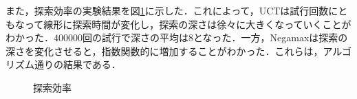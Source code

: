 \documentclass{jarticle}
\begin{document}
また，探索効率の実験結果を図\ref{fig:search}に示した．これによって，UCTは試行回数にともなって線形に探索時間が変化し，探索の深さは徐々に大きくなっていくことがわかった．$400000$回の試行で深さの平均は$8$となった．一方，Negamaxは探索の深さを変化させると，指数関数的に増加することがわかった．これらは，アルゴリズム通りの結果である．

\begin{figure}[H]
\centering
	\caption{探索効率}
	\label{fig:search}
\end{figure}
\end{document}
